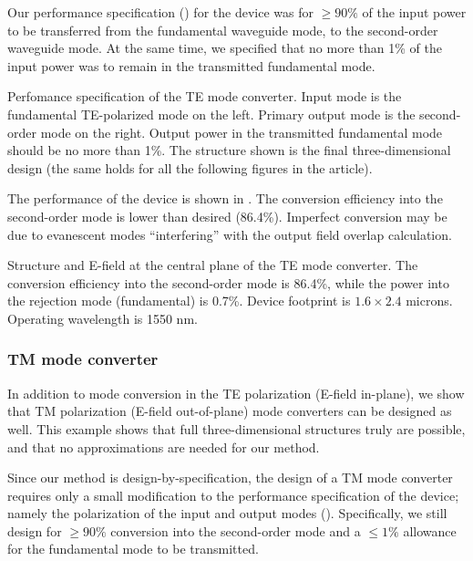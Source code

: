 \documentclass[letterpaper,10pt]{article}
\begin{document}
Our performance specification () 
    for the device was for $\ge90\%$ of the 
    input power to be transferred from the fundamental waveguide mode,
    to the second-order waveguide mode.
At the same time, we specified that no more than 1\% of the input power
    was to remain in the transmitted fundamental mode.

    {Perfomance specification of the TE mode converter.
    Input mode is the fundamental TE-polarized mode on the left.
    Primary output mode is the second-order mode on the right.
    Output power in the transmitted fundamental mode 
    should be no more than 1\%.
    The structure shown is the final three-dimensional design
    (the same holds for all the following figures in the article).
    }

The performance of the device is shown in .
The conversion efficiency into the second-order mode is lower
    than desired (86.4\%). 
Imperfect conversion may be due to evanescent modes ``interfering'' 
    with the output field overlap calculation.

    {Structure and E-field at the central plane of the TE mode converter.
    The conversion efficiency into the second-order mode is 86.4\%,
    while the power into the rejection mode (fundamental) is 0.7\%.
    Device footprint is $1.6\times2.4$ microns.
    Operating wavelength is 1550 nm.}


\subsubsection{TM mode converter}

In addition to mode conversion in the TE polarization (E-field in-plane),
    we show that TM polarization (E-field out-of-plane) mode converters
    can be designed as well.
This example shows that full three-dimensional structures 
    truly are possible,
    and that no approximations are needed for our method.

Since our method is design-by-specification, 
    the design of a TM mode converter requires only
    a small modification to the performance specification of the device;
    namely the polarization of the input and output modes ().
Specifically, we still design for 
    $\ge 90\%$ conversion into the second-order mode and 
    a $\le 1\%$ allowance for the fundamental mode to be transmitted.
\end{document}
